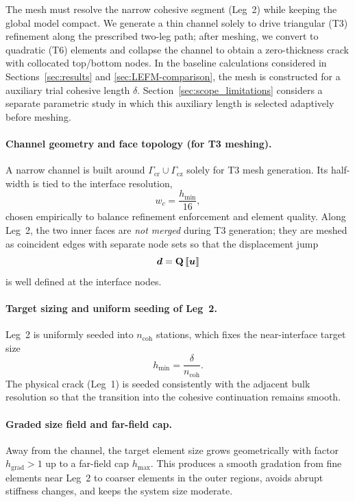 \documentclass[smallextended]{svjour3}       %
\newcommand{\vb}[1]{\bm{#1}}      %
\newcommand{\mat}[1]{\mathbf{#1}}  %
\newcommand{\QQ}{\mat{Q}}          %
\newcommand{\uu}{\vb{u}}
\DeclarePairedDelimiter{\jump}{\llbracket}{\rrbracket}
\providecommand{\bd}{\vb d}
\renewcommand{\bd}{\vb d}
\begin{document}
The mesh must resolve the narrow cohesive segment (Leg~2) while keeping the
global model compact. We generate a thin channel solely to drive triangular
(T3) refinement along the prescribed two-leg path; after meshing, we convert
to quadratic (T6) elements and collapse the channel to obtain a
zero-thickness crack with collocated top/bottom nodes. In the baseline
calculations considered in Sections~\ref{sec:results} and
\ref{sec:LEFM-comparison}, the mesh is constructed for a auxiliary trial
cohesive length \(\delta\). Section~\ref{sec:scope_limitations} considers a
separate parametric study in which this auxiliary length is selected
adaptively before meshing.

\paragraph{Channel geometry and face topology (for T3 meshing).}
A narrow channel is built around
\(\Gamma_{\mathrm{cr}}\cup\Gamma_{\mathrm{cz}}\) solely for T3 mesh
generation. Its half-width is tied to the interface resolution,
\[
w_c=\frac{h_{\min}}{16},
\]
chosen empirically to balance refinement enforcement and element quality.
Along Leg~2, the two inner faces are \emph{not merged} during T3 generation;
they are meshed as coincident edges with separate node sets so that the
displacement jump
\[
\bd=\QQ\,\jump{\uu}
\]
is well defined at the interface nodes.

\paragraph{Target sizing and uniform seeding of Leg~2.}
Leg~2 is uniformly seeded into \(n_{\mathrm{coh}}\) stations, which fixes the
near-interface target size
\[
h_{\min}=\frac{\delta}{n_{\mathrm{coh}}}.
\]
The physical crack (Leg~1) is seeded consistently with the adjacent bulk
resolution so that the transition into the cohesive continuation remains
smooth.

\paragraph{Graded size field and far-field cap.}
Away from the channel, the target element size grows geometrically with
factor \(h_{\mathrm{grad}}>1\) up to a far-field cap \(h_{\max}\). This
produces a smooth gradation from fine elements near Leg~2 to coarser
elements in the outer regions, avoids abrupt stiffness changes, and keeps
the system size moderate.
\end{document}
